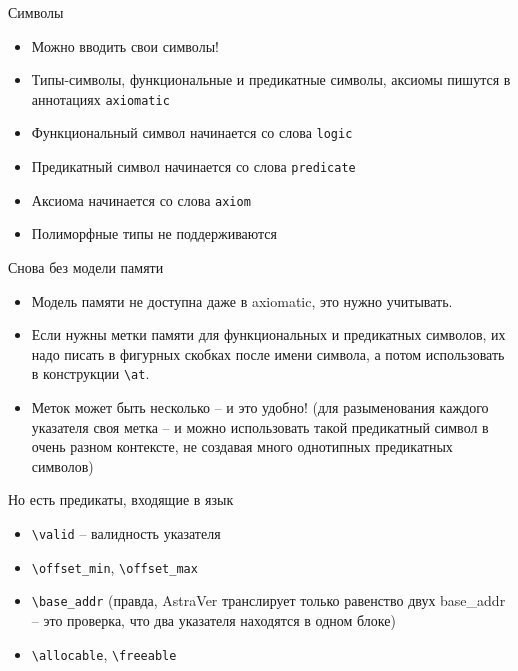 \documentclass[hyperref={unicode=true}]{beamer}
\begin{document}
    \begin{frame}{Символы}
    \begin{itemize}
    \item
    Можно вводить свои символы!
    \item
    Типы-символы, функциональные и предикатные символы, аксиомы
    пишутся в аннотациях \texttt{axiomatic}
    \item
    Функциональный символ начинается со слова \texttt{logic}
    \item
    Предикатный символ начинается со слова \texttt{predicate}
    \item
    Аксиома начинается со слова \texttt{axiom}
    \item
    Полиморфные типы не поддерживаются
    \end{itemize}
    \end{frame}

    \begin{frame}{Снова без модели памяти}
    \begin{itemize}
    \item
    Модель памяти не доступна даже в axiomatic, это нужно учитывать.
    \item
    Если нужны метки памяти для функциональных и предикатных символов,
    их надо писать в фигурных скобках после имени символа, а потом
    использовать в конструкции \texttt{\textbackslash{}at}.
    \item
    Меток может быть несколько -- и это удобно! (для разыменования
            каждого указателя своя метка -- и можно использовать
            такой предикатный символ в очень разном контексте,
            не создавая много однотипных предикатных символов)
    \end{itemize}
    \end{frame}

    \begin{frame}{Но есть предикаты, входящие в язык}
    \begin{itemize}
    \item
    \texttt{\textbackslash{}valid} -- валидность указателя
    \item
    \texttt{\textbackslash{}offset\_min}, \texttt{\textbackslash{}offset\_max}
    \item
    \texttt{\textbackslash{}base\_addr} (правда, AstraVer транслирует
    только равенство двух base\_addr -- это  проверка, что два
    указателя находятся в одном блоке)
    \item
    \texttt{\textbackslash{}allocable}, \texttt{\textbackslash{}freeable}
    \end{itemize}
    \end{frame}
\end{document}
